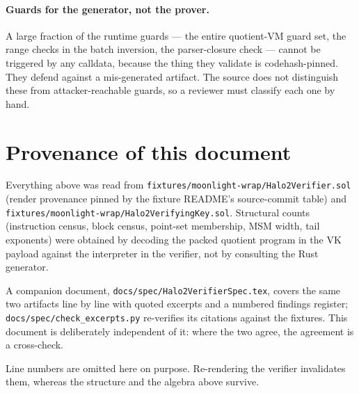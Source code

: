 \documentclass[11pt,a4paper]{article}
\newcommand{\code}[1]{\texttt{#1}}
\theoremstyle{definition}
\begin{document}
\paragraph{Guards for the generator, not the prover.}
A large fraction of the runtime guards --- the entire quotient-VM guard set,
the range checks in the batch inversion, the parser-closure check --- cannot be
triggered by any calldata, because the thing they validate is
codehash-pinned. They defend against a mis-generated artifact. The source does
not distinguish these from attacker-reachable guards, so a reviewer must
classify each one by hand.

\section{Provenance of this document}

Everything above was read from
\code{fixtures/moonlight-wrap/Halo2Verifier.sol} (render provenance pinned by
the fixture README's source-commit table) and
\code{fixtures/moonlight-wrap/Halo2VerifyingKey.sol}. Structural counts
(instruction census, block census, point-set membership, MSM width, tail
exponents) were obtained by decoding the packed quotient program in the VK
payload against the interpreter in the verifier, not by consulting the Rust
generator.

A companion document, \code{docs/spec/Halo2VerifierSpec.tex}, covers the same
two artifacts line by line with quoted excerpts and a numbered findings
register; \code{docs/spec/check\_excerpts.py} re-verifies its citations against
the fixtures. This document is deliberately independent of it: where the two
agree, the agreement is a cross-check.

Line numbers are omitted here on purpose. Re-rendering the verifier invalidates
them, whereas the structure and the algebra above survive.
\end{document}
